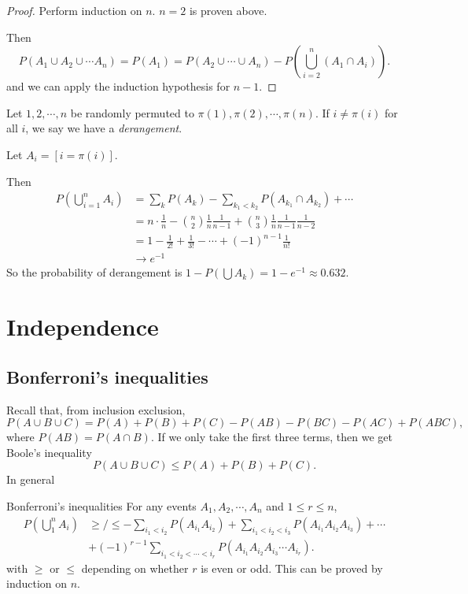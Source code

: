\documentclass[a4paper]{article}
\begin{document}
\begin{proof}
  Perform induction on $n$. $n = 2$ is proven above.

  Then
  \[
    P(A_1\cup A_2\cup \cdots A_n) = P(A_1) = P(A_2\cup\cdots\cup A_n) - P\left(\bigcup_{i = 2}^n (A_1\cap A_i)\right).
  \]
  and we can apply the induction hypothesis for $n - 1$.
\end{proof}

\begin{eg}
  Let $1, 2, \cdots, n$ be randomly permuted to $\pi(1), \pi(2), \cdots, \pi(n)$. If 
  $i \not= \pi(i)$ for all $i$, we say we have a \emph{derangement}.

  Let $A_i = [i = \pi(i)]$.

  Then
  \begin{align*}
    P\left(\bigcup _{i = 1}^n A_i\right) &= \sum_{k} P(A_k) - \sum_{k_1 < k_2} P(A_{k_1} \cap A_{k_2}) + \cdots\\
    &= n\cdot \frac{1}{n} - \binom{n}{2}\frac{1}{n}\frac{1}{n - 1} + \binom{n}{3}\frac{1}{n}\frac{1}{n - 1}\frac{1}{n - 2}\\
    &= 1 - \frac{1}{2!} + \frac{1}{3!} - \cdots + (-1)^{n - 1}\frac{1}{n!}\\
    &\to e^{-1}
  \end{align*}
  So the probability of derangement is $1 - P(\bigcup A_k) = 1 - e^{-1}\approx 0.632$.
\end{eg}
\section{Independence}
\subsection{Bonferroni's inequalities}
Recall that, from inclusion exclusion,
\[
  P(A\cup B\cup C) = P(A) + P(B) + P(C) - P(AB) - P(BC) - P(AC) + P(ABC),
\]
where $P(AB) = P(A\cap B)$. If we only take the first three terms, then we get Boole's inequality
\[
  P(A\cup B\cup C) \leq P(A) + P(B) + P(C).
\]
In general
\begin{thm}{Bonferroni's inequalities}
For any events $A_1, A_2, \cdots, A_n$ and $1 \leq r\leq n$,
\begin{align*}
  P(\bigcup_{1}^n A_i) &\geq/\leq - \sum_{i_1 < i_2} P(A_{i_1}A_{i_2}) + \sum_{i_1 < i_2 < i_3} P(A_{i_1}A_{i_2}A_{i_3}) + \cdots\\
  &+ (-1)^{r - 1}\sum_{i_1 < i_2 < \cdots < i_r} P(A_{i_1}A_{i_2}A_{i_3}\cdots A_{i_r}).
\end{align*}
with $\geq$ or $\leq$ depending on whether $r$ is even or odd. This can be proved by induction on $n$. 
\end{thm}
\end{document}
